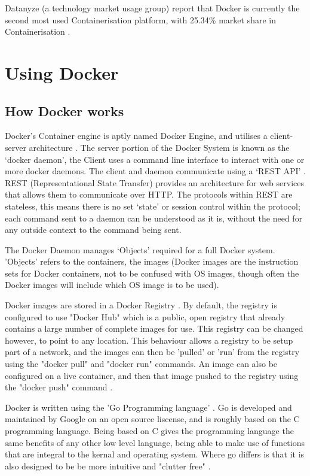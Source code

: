 Datanyze (a technology market usage group) report that Docker is currently the second most used Containerisation platform, with 25.34\% market share in Containerisation \citep{datanyze}. 
\section{Using Docker}
\subsection{How Docker works}
\label{subsec:docker}
Docker's Container engine is aptly named Docker Engine, and utilises a client-server architecture \citep[Section: Docker architecture]{DockerOverview}. The server portion of the Docker System is known as the `docker daemon', the Client uses a command line interface to interact with one or more docker daemons. The client and daemon communicate using a `REST API' \citep[Section: The Docker daemon]{DockerOverview}. REST (Representational State Transfer) provides an architecture for web services \citep{W3Architecture2004} that allows them to communicate over HTTP. The protocols within REST are stateless, this means there is no set `state' or session control within the protocol; each command sent to a daemon can be understood as it is, without the need for any outside context to the command being sent.

The Docker Daemon manages `Objects' \citep[Section: Docker objects]{DockerOverview} required for a full Docker system. 'Objects' refers to the containers, the images (Docker images are the instruction sets for Docker containers, not to be confused with OS images, though often the Docker images will include which OS image is to be used).

Docker images are stored in a Docker Registry \citep[Section: Docker registries]{DockerOverview}. By default, the registry is configured to use "Docker Hub" which is a public, open registry that already contains a large number of complete images for use. This registry can be changed however, to point to any location. This behaviour allows a registry to be setup part of a network, and the images can then be 'pulled' or 'run' from the registry using the "docker pull" and "docker run" commands\citep[Section: Docker registries]{DockerOverview}. An image can also be configured on a live container, and then that image pushed to the registry using the "docker push" command \citep[Section: Docker registries]{DockerOverview}.


Docker is written using the 'Go Programming language' \citep[Section: The underlying technology]{DockerOverview}. Go is developed and maintained by Google on an open source liscense, and is roughly based on the C programming language\citep{GoAncestors}. Being based on C gives the programming language the same benefits of any other low level language, being able to make use of functions that are integral to the kernal and operating system. Where go differs is that it is also designed to be be more intuitive and "clutter free" \citep{GoPrinciples}.

